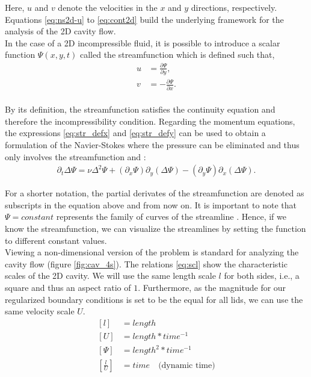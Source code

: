 Here, $u$ and $v$ denote the velocities in the $x$ and $y$ directions,
respectively. Equations \eqref{eq:ns2d-u} to \eqref{eq:cont2d} build the
underlying framework for the analysis of the 2D cavity flow. \\

In the case of a 2D incompressible fluid, it is possible to introduce a scalar
function $\Psi(x,y,t)$ called the streamfunction which is defined such that,
\begin{align}
u & = \frac{\partial \Psi}{\partial y}, \label{eq:str_defx} \\
v & = -\frac{\partial \Psi}{\partial x}. \label{eq:str_defy} 
\end{align} \\

By its definition, the streamfunction satisfies the continuity equation and
therefore the incompressibility condition. Regarding the momentum equations,
the expressions \eqref{eq:str_defx} and \eqref{eq:str_defy} can be used to
obtain a formulation of the Navier-Stokes where the pressure can be eliminated
and thus only involves the streamfunction and \citep{landau1987}:
\begin{align}
\partial_t \Delta \Psi = \nu \Delta^2 \Psi
  + (\partial_x \Psi) \partial_y(\Delta \Psi)
  - (\partial_y \Psi) \partial_x(\Delta \Psi). \label{eq:str_dim}
\end{align}

For a shorter notation, the partial derivates of the streamfunction are denoted
as subscripts in the equation above and from now on. It is important to note
that $\Psi = constant$ represents the family of curves of the streamline
\citep{landau1987}. Hence, if we know the streamfunction, we can visualize the
streamlines by setting the function to different constant values. \\

Viewing a non-dimensional version of the problem is standard for analyzing the
cavity flow (figure \ref{fig:cav_4s}). The relations \eqref{eq:scl} show the
characteristic scales of the 2D cavity. We will use the same length scale $l$
for both sides, i.e., a square and thus an aspect ratio of $1$. Furthermore, as
the magnitude for our regularized boundary conditions is set to be the equal
for all lids, we can use the same velocity scale $U$.
\vspace{-5pt}
\begin{equation}
\begin{split}
\left[ l \right] &= length  \\
\left[ U \right] &= length*time^{-1} \\
\left[ \Psi \right] &= length^2*time^{-1} \\
\left[ \frac{l}{U} \right] &= time \quad \text{(dynamic time)} \\
\end{split}
\label{eq:scl}
\end{equation}

